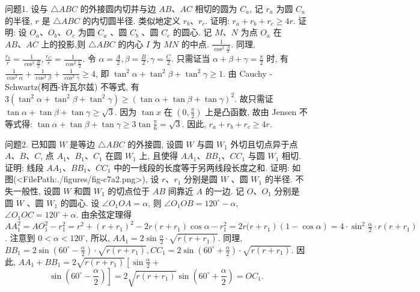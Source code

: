 
问题1. 设与 $\triangle A B C$ 的外接圆内切并与边 $A B 、 A C$ 相切的圆为 $C_a$, 记 $r_a$ 为圆 $C_a$ 的半径, $r$ 是 $\triangle A B C$ 的内切圆半径.
类似地定义 $r_b 、 r_c$. 证明: $r_a+r_b+r_c \geqslant 4 r$.
证明: 设 $O_a 、 O_b 、 O_c$ 为圆 $C_a$ 、圆 $C_b$ 、圆 $C_c$ 的圆心.
记 $M 、 N$ 为点 $O_a$ 在 $A B 、 A C$ 上的投影,则 $\triangle A B C$ 的内心 $I$ 为 $M N$ 的中点.
$\frac{1}{\cos ^2 \frac{A}{2}}$. 同理, $\frac{r_b}{r}=\frac{1}{\cos ^2 \frac{B}{2}}, \frac{r_C}{r}=\frac{1}{\cos ^2 \frac{C}{2}}$. 令 $\alpha=\frac{A}{2}, \beta=\frac{B}{2}, \gamma=\frac{C}{2}$. 只需证当 $\alpha+\beta+\gamma=\frac{\pi}{2}$ 时, 有 $\frac{1}{\cos ^2 \alpha}+\frac{1}{\cos ^2 \beta}+\frac{1}{\cos ^2 \gamma} \geqslant 4$, 即 $\tan ^2 \alpha+\tan ^2 \beta+ \tan ^2 \gamma \geqslant 1$.
由 Cauchy - Schwartz(柯西-许瓦尔兹) 不等式, 有 $3\left(\tan ^2 \alpha+\tan ^2 \beta+\right.\left.\tan ^2 \gamma\right) \geqslant(\tan \alpha+\tan \beta+\tan \gamma)^2$. 故只需证 $\tan \alpha+\tan \beta+\tan \gamma \geqslant \sqrt{3}$. 因为 $\tan x$ 在 $\left(0, \frac{\pi}{2}\right)$ 上是凸函数, 故由 Jensen 不等式得: $\tan \alpha+\tan \beta+\tan \gamma \geqslant 3 \tan \frac{\pi}{6}=\sqrt{3}$. 因此, $r_a+r_b+r_c \geqslant 4 r$.



问题2. 已知圆 $W$ 是等边 $\triangle A B C$ 的外接圆, 设圆 $W$ 与圆 $W_1$ 外切且切点异于点 $A 、 B 、 C$, 点 $A_1 、 B_1 、 C_1$ 在圆 $W_1$ 上, 且使得 $A A_1 、 B B_1 、 C C_1$ 与圆 $W_1$ 相切.
证明: 线段 $A A_1 、 B B_1 、 C C_1$ 中的一线段的长度等于另两线段长度之和.
证明: 如图(<FilePath:./figures/fig-c7a2.png>), 设 $r 、 r_1$ 分别是圆 $W$ 、圆 $W_1$ 的半径.
不失一般性, 设圆 $W$ 和圆 $W_1$ 的切点位于 $A B$ 间靠近 $A$ 的一边.
记 $O 、 O_1$ 分别是圆 $W$ 、圆 $W_1$ 的圆心.
设 $\angle O_1 O A=\alpha$, 则 $\angle O_1 O B=120^{\circ}-\alpha$, $\angle O_1 O C=120^{\circ}+\alpha$. 由余弦定理得 $A A_1^2=A O_1^2- r_1^2=r^2+\left(r+r_1\right)^2-2 r\left(r+r_1\right) \cos \alpha-r_1^2=2 r(r+\left.r_1\right)(1-\cos \alpha)=4 \cdot \sin ^2 \frac{\alpha}{2} \cdot r\left(r+r_1\right)$. 注意到 $0<\alpha<120^{\circ}$, 所以, $A A_1= 2 \sin \frac{\alpha}{2} \cdot \sqrt{r\left(r+r_1\right)}$. 同理, $B B_1=2 \sin \left(60^{\circ}-\frac{\alpha}{2}\right) \cdot \sqrt{r\left(r+r_1\right)}, C C_1= 2 \sin \left(60^{\circ}+\frac{\alpha}{2}\right) \cdot \sqrt{r\left(r+r_1\right)}$. 因此, $A A_1+B B_1=2 \sqrt{r\left(r+r_1\right)}\left[\sin \frac{\alpha}{2}+\right.$
$$
\left.\sin \left(60^{\circ}-\frac{\alpha}{2}\right)\right]=2 \sqrt{r\left(r+r_1\right)} \sin \left(60^{\circ}+\frac{\alpha}{2}\right)=O C_1 .
$$



